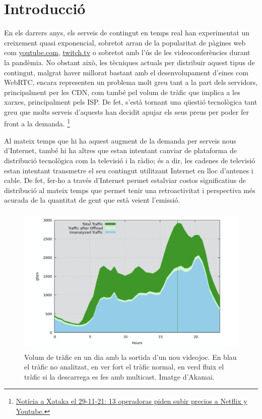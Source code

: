 \section{Introducció}
{
    En els darrers anys, els serveis de contingut en temps real han experimentat un creixement quasi exponencial, sobretot arran de la
    popularitat de pàgines web com \url{youtube.com}, \url{twitch.tv} o sobretot amb l'ús de les videoconferències durant la pandèmia.
    No obstant això, les tècniques actuals per distribuir aquest tipus de contingut, malgrat haver millorat bastant amb el desenvolupament
    d'eines com \ac{WebRTC}, encara representen un problema molt greu tant a la part dels servidors, principalment per les \ac{CDN}, com també pel
    volum de tràfic que implica a les xarxes, principalment pels \ac{ISP}. De fet, s'està tornant una qüestió tecnològica tant greu que molts
    serveis d'aquests han decidit apujar els seus preus per poder fer front a la demanda.
    \footnote{\href{https://www.xataka.com/empresas-y-economia/13-grandes-operadoras-se-unen-para-volver-a-pedir-a-europa-pago-tuberias-que-servicios-como-netflix-youtube-ayuden-costes-red}{Notícia a Xataka el 29-11-21: 13 operadoras piden subir precios a Netflix y Youtube.}}

    Al mateix temps que hi ha aquest augment de la demanda per serveis nous d'Internet, també hi ha altres que estan intentant canviar
    de plataforma de distribució tecnològica com la televisió i la ràdio; és a dir, les cadenes de televisió estan intentant transmetre el seu contingut utilitzant Internet en lloc d'antenes i cable. 
    De fet, fer-ho a través d'Internet permet estalviar costos significatius de distribució al mateix temps que permet tenir una retroactivitat i perspectiva més acurada
    de la quantitat de gent que està veient l'emissió.

    \begin{figure}[H]
        \label{fig:trafic_desglosat}
        \centering
        \includegraphics[width=15cm, height=7.2cm]{img/01_introduccio/trafic_peak.png}
        \caption[Trafic d'Internet]{\footnotesize{Volum de tràfic en un dia amb la sortida d'un nou videojoc. En blau el tràfic no analitzat,
        en ver fort el tràfic normal, en verd fluix el tràfic si la descarrega es fes amb multicast. Imatge d'Akamai.}}
    \end{figure}

}
